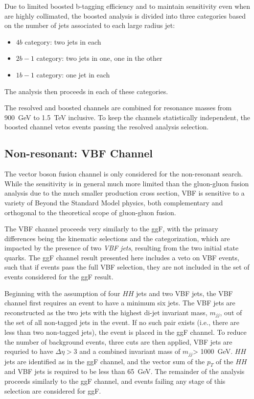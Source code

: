Due to limited boosted b-tagging efficiency and to maintain sensitivity 
even when \bjets are highly collimated, the boosted analysis is divided into three categories 
based on the number of \btagged jets associated to each large radius jet:
\begin{itemize}
	\item $4b$ category: two \btagged jets in each
	\item $2b-1$ category: two \btagged jets in one, one in the other
	\item $1b-1$ category: one \btagged jet in each
\end{itemize} 

The analysis then proceeds in each of these categories.

The resolved and boosted channels are combined for resonance masses from \SI{900}{\GeV} 
to \SI{1.5}{\TeV} inclusive. To keep the channels statistically independent, the boosted channel 
vetos events passing the resolved analysis selection.


\subsection{Non-resonant: VBF Channel} 
The vector boson fusion channel is only considered for the non-resonant search. While the 
sensitivity is in general much more limited than the gluon-gluon fusion analysis due to the 
much smaller production cross section, VBF is sensitive to a variety of Beyond the Standard 
Model physics, both complementary and orthogonal to the theoretical scope of gluon-gluon fusion. 

The VBF channel proceeds very similarly to the ggF, with the primary differences being the 
kinematic selections and the categorization, which are impacted by the 
presence of two \emph{VBF jets}, resulting from the two initial state quarks. The ggF channel 
result presented here includes a veto on VBF events, such that if events pass the full 
VBF selection, they are not included in the set of events considered for the ggF result.

Beginning with the assumption of four $HH$ jets and two VBF jets, the VBF channel first requires an 
event to have a minimum six jets. The VBF jets are reconstructed as the two jets with the 
highest di-jet invariant mass, $m_{jj}$, out of the set of all non-tagged jets in the event. If no such pair 
exists (i.e., there are less than two non-tagged jets), the event is placed in the ggF channel. 
To reduce the number of background events, three cuts are then applied, VBF jets are requried to have 
$\Delta \eta > 3$ and a combined invariant mass of $m_{jj}$> \SI{1000}{\GeV}. $HH$ jets are identified 
as in the ggF channel, and the vector sum of the $p_{T}$ of the $HH$ and VBF jets is required to be 
less than \SI{65}{\GeV}. The remainder of the analysis proceeds similarly to the ggF channel, and 
events failing any stage of this selection are considered for ggF.

